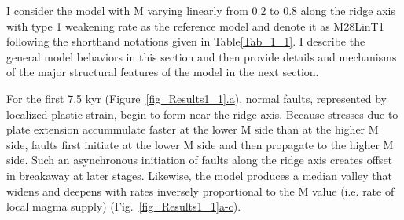 I consider the model with M varying linearly from 0.2 to 0.8 along the ridge axis with type 1 weakening rate as the reference model and denote it as M28LinT1 following the shorthand notations given in Table\ref{Tab_1_1}. I describe the general model behaviors in this section and then provide details and mechanisms of the major structural features of the model in the next section.

For the first 7.5 kyr (Figure~\hyperref[fig_Results1_1]{\ref{fig_Results1_1}.a}), %
normal faults, represented by localized plastic strain, begin to form near the ridge axis.
Because stresses due to plate extension accummulate faster at the lower M side than at the higher M side, faults first initiate at the lower M side and then propagate to the higher M side. Such an asynchronous initiation of faults along the ridge axis creates offset in breakaway at later stages.
Likewise, the model produces a median valley that widens and deepens with rates inversely proportional to the M value (i.e. rate of local magma supply) (Fig.~\hyperref[fig_Results1_1]{\ref{fig_Results1_1}a-c}).  %



